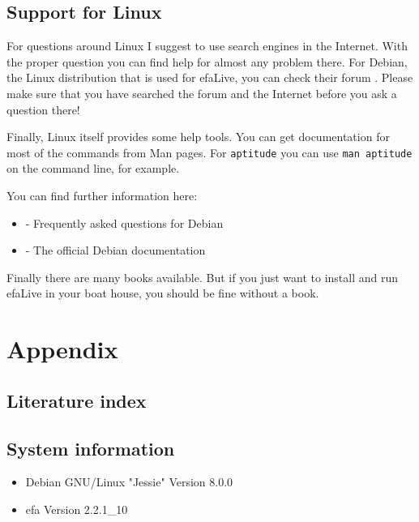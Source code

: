 \documentclass[a4paper,12pt,twoside]{article}
\begin{document}
\subsection{Support for Linux}
\label{support_linux}
For questions around Linux I suggest to use search engines in the
Internet. With the proper question you can find help for almost any
problem there. For Debian, the Linux distribution that is used for
efaLive, you can check their forum \cite{HLP1}. Please make sure that
you have searched the forum and the Internet before you ask a question
there!

Finally, Linux itself provides some help tools. You can get
documentation for most of the commands from Man pages. For
\texttt{aptitude} you can use \texttt{man
aptitude} on the command line, for example.

You can find further information here:

\begin{itemize}
    \item \cite{HLP2} - Frequently asked questions for Debian
    \item \cite{HLP3} - The official Debian documentation
\end{itemize}

Finally there are many books available. But if you just want to install
and run efaLive in your boat house, you should be fine without a book.


\clearpage
\section{Appendix}
\label{sct:appendix}
\subsection{Literature index}
\label{sct:literature}




\subsection{System information}
\label{sct:sysinfo}

\begin{itemize}
    \item Debian GNU/Linux "Jessie" Version 8.0.0
    \item efa Version 2.2.1\_10
\end{itemize}
\end{document}
